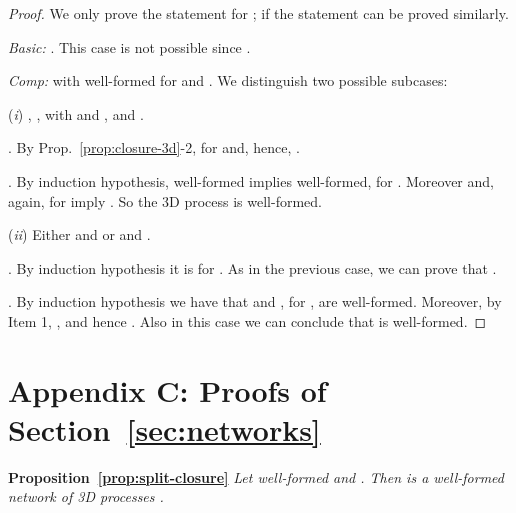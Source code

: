 \documentclass[11pt]{article}
\begin{document}
\par\smallskip\noindent \begin{proof}
We only prove the statement for ; if  the statement can be
proved similarly.

\par\medskip\noindent
{\em Basic:} . This case is not possible since .
\par\medskip\noindent
{\em Comp:}  with  well-formed for  and . We distinguish two possible subcases:

\noindent ({\it i}) , ,  with  and , and .

\par\medskip{}. By Prop.~\ref{prop:closure-3d}-2,  for 
and, hence, .

\par\smallskip{}. By induction hypothesis,  well-formed implies  well-formed, for
. Moreover  and, again,  for 
imply . So the 3D process  is well-formed.

\par\medskip\noindent ({\it ii}) Either  and  or  and
.

\par\medskip{}. By induction hypothesis it is  for . As
in the previous case, we can prove that .

\par\smallskip{}. By induction hypothesis we have that  and  , for , are well-formed. Moreover, by Item 1, , and hence . Also in this case we can
conclude that  is well-formed.
\end{proof}

\section*{Appendix C: Proofs of Section~\ref{sec:networks}}
\par\medskip\noindent
{\bf Proposition~\ref{prop:split-closure}}
\em Let  well-formed and . Then  is
a well-formed network of 3D processes \rm.

\medskip
\end{document}

